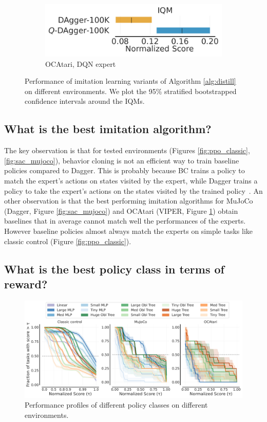 \begin{figure}[ht]
\begin{subfigure}{.33\textwidth}
  \centering
  \includegraphics[width=\linewidth]{images/images_part3/dqn_expert_atari.pdf}
  \caption{OCAtari, DQN expert}
  \label{fig:dqn_atari}
\end{subfigure}%
\caption{Performance of imitation learning variants of Algorithm \ref{alg:distill} on different environments. We plot the 95\% stratified bootstrapped confidence intervals around the IQMs.}
\label{fig:performance_comparison}
\end{figure}

\subsection{What is the best imitation algorithm?}

The key observation is that for tested environments (Figures \ref{fig:ppo_classic},\ref{fig:sac_mujoco}), behavior cloning is not an efficient way to train baseline policies compared to Dagger.
This is probably because BC trains a policy to match the expert's actions on states visited by the expert, while Dagger trains a policy to take the expert's actions on the states visited by the trained policy~\cite{dagger}.
An other observation is that the best performing imitation algorithms for MuJoCo (Dagger, Figure \ref{fig:sac_mujoco}) and OCAtari (VIPER, Figure \ref{fig:dqn_atari}) obtain baselines that in average cannot match well the performances of the experts.
However baseline policies almost always match the experts on simple tasks like classic control (Figure \ref{fig:ppo_classic}).

\subsection{What is the best policy class in terms of reward?}

\begin{figure}[ht]
    \centering
    \includegraphics[trim={0 0 0 0.2cm},clip,width=0.9\linewidth]{images/images_part3/perf_profile_combined_100k.pdf}
    \caption{Performance profiles of different policy classes on different environments.}
    \label{fig:perf-combined}
\end{figure}

